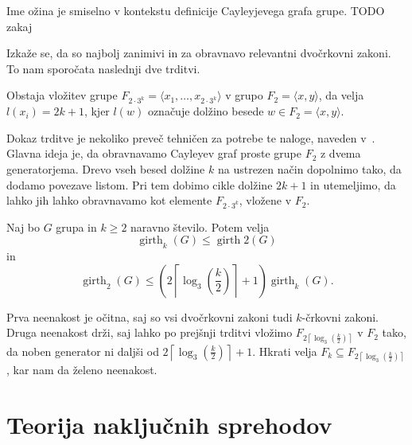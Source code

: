 \documentclass[mat1, tisk]{fmfdelo}
\numberwithin{equation}{section}  %
\begin{document}
\begin{opomba}
Ime ožina je smiselno v kontekstu definicije Cayleyjevega grafa grupe. TODO zakaj
\end{opomba}


Izkaže se, da so najbolj zanimivi in za obravnavo relevantni dvočrkovni zakoni. To nam sporočata naslednji dve trditvi.
\begin{trditev}
\label{trd_vlozitev_proste_grupe}
 Obstaja vložitev grupe $F_{2 \cdot 3^{k}} = \langle x_1, \ldots, x_{2 \cdot 3^{k}} \rangle$ v grupo $F_2 = \langle x,y \rangle $, da velja $l(x_i) = 2k + 1$, kjer $l(w)$ označuje dolžino besede $w \in F_2 = \langle x,y \rangle$. 
\end{trditev}


\begin{dokaz}
    Dokaz trditve je nekoliko preveč tehničen za potrebe te naloge, naveden v~\cite{Schneider_2016}. Glavna ideja je, da obravnavamo Cayleyev graf proste grupe $F_2$ z dvema generatorjema.
Drevo vseh besed dolžine $k$ na ustrezen način dopolnimo tako, da dodamo povezave listom. Pri tem dobimo cikle dolžine $2k + 1$ in utemeljimo, da lahko jih lahko obravnavamo kot elemente $F_{2 \cdot 3^{k}}$, vložene v $F_2$. 
\end{dokaz}


\begin{posledica}\label{psl_veccrkovni_zakoni_meje}
Naj bo $G$ grupa in $k \ge 2$ naravno število. Potem velja \begin{equation*}
     \operatorname{girth}_{k}(G) \le  \operatorname{girth}{2}(G) 
\end{equation*}  
in \begin{equation*}
\operatorname{girth}_{2}(G) \le \left( {2 \left\lceil \log_3(\frac{k}{2}) \right\rceil + 1  } \right) \operatorname{girth}_{k}(G).
\end{equation*}  
\end{posledica}
\begin{dokaz}
    Prva neenakost je očitna, saj so vsi dvočrkovni zakoni tudi $k$-črkovni zakoni. Druga neenakost drži, saj lahko po prejšnji trditvi vložimo $F_{{2 \left\lceil \log_3(\frac{k}{2}) \right\rceil}}$ v $F_2$
    tako, da noben generator ni daljši od ${2 \left\lceil \log_3(\frac{k}{2}) \right\rceil + 1  }$. Hkrati velja $F_k \subseteq F_{{2 \left\lceil \log_3(\frac{k}{2}) \right\rceil}}$, kar nam da želeno neenakost.
\end{dokaz}


\section{Teorija naključnih sprehodov}
\end{document}
